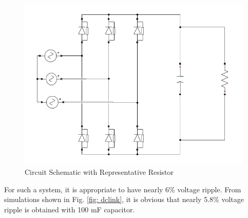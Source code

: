 \begin{center}
\begin{figure}[H]
\centering
\includegraphics [width= 10 cm]{figs/dclinkschematic.png}
\caption{Circuit Schematic with Representative Resistor}
\label{fig: LABEL}
\end{figure}
\end{center}

For such a system, it is appropriate to have nearly 6\% voltage ripple. From simulations shown in Fig. \ref{fig: dclink}, it is obvious that nearly 5.8\% voltage ripple is obtained with 100 mF capacitor. 

